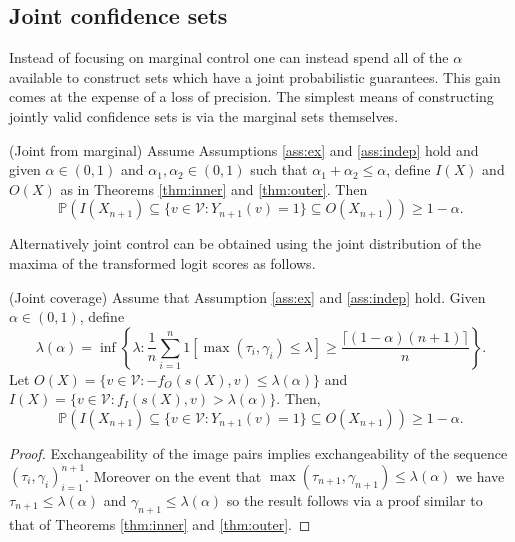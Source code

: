 \subsection{Joint confidence sets}\label{SS:joint}
Instead of focusing on marginal control one can instead spend all of the $\alpha$ available to construct sets which have a joint probabilistic guarantees. This gain comes at the expense of a loss of precision. The simplest means of constructing jointly valid confidence sets is via the marginal sets themselves.
\begin{corollary}\label{cor:weighting}
	(Joint from marginal) Assume Assumptions \ref{ass:ex} and \ref{ass:indep} hold and given $\alpha \in (0,1)$ and $\alpha_1, \alpha_2 \in (0,1)$ such that $\alpha_1 + \alpha_2 \leq \alpha$, define $I(X)$ and  $O(X)$ as in Theorems \ref{thm:inner} and \ref{thm:outer}. Then 
	\begin{equation}
		\mathbb{P}\left( I(X_{n+1}) \subseteq \lbrace v\in \mathcal{V}: Y_{n+1}(v) = 1 \rbrace \subseteq O(X_{n+1})  \right) \geq  1-\alpha. 
	\end{equation}
\end{corollary}
Alternatively joint control can be obtained using the joint distribution of the maxima of the transformed logit scores as follows.
\begin{theorem}\label{thm:joint}
	(Joint coverage) Assume that Assumption \ref{ass:ex} and \ref{ass:indep}  hold. Given $\alpha \in (0,1)$, define 
	\begin{equation*}
		\lambda(\alpha) = \inf\left\lbrace \lambda: \frac{1}{n} \sum_{i = 1}^n 1\left[ \max(\tau_i, \gamma_i) \leq \lambda \right] \geq \frac{\lceil (1-\alpha)(n+1) \rceil}{n} \right\rbrace.
	\end{equation*}
 Let $O(X) = \lbrace v \in \mathcal{V}: -f_O(s(X),v) \leq \lambda(\alpha) \rbrace $ and $I(X) = \lbrace v \in \mathcal{V}: f_I(s(X),v) >	\lambda(\alpha) \rbrace $. Then,
\begin{equation}\label{eq:probstat}
	\mathbb{P}\left( I(X_{n+1}) \subseteq \lbrace v\in \mathcal{V}: Y_{n+1}(v) = 1 \rbrace \subseteq O(X_{n+1}) \right) \geq 1 - \alpha.
\end{equation}
\end{theorem}
\begin{proof}
	Exchangeability of the image pairs implies exchangeability of the sequence $(\tau_i, \gamma_i)_{i = 1}^{n+1}$. Moreover on the event that $\max(\tau_{n+1}, \gamma_{n+1}) \leq \lambda(\alpha)$ we have $\tau_{n+1} \leq \lambda(\alpha)$ and $\gamma_{n+1} \leq \lambda(\alpha)$ so the result follows via a proof similar to that of Theorems \ref{thm:inner} and \ref{thm:outer}.
\end{proof}

